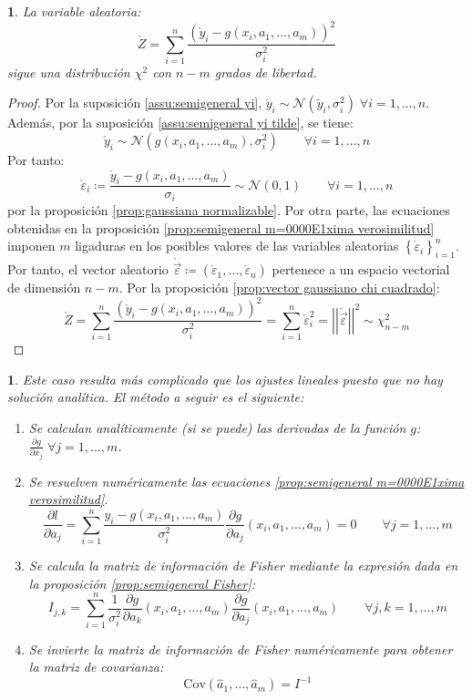 \documentclass[11pt,a4paper,spanish]{article}
\numberwithin{equation}{section}
\numberwithin{table}{section}
\numberwithin{figure}{section}
\theoremstyle{definition}
\theoremstyle{remark}
\theoremstyle{definition}
\theoremstyle{remark}
\theoremstyle{plain}
\newtheorem{prop}{\protect\propositionname}[section]
\theoremstyle{plain}
\theoremstyle{plain}
\theoremstyle{plain}
\theoremstyle{plain}
\theoremstyle{plain}
\newtheorem{lyxalgorithm}{\protect\algorithmname}[section]
\providecommand{\algorithmname}{Implementación en el ordenador}
\providecommand{\algorithmname}{Algoritmo}
\providecommand{\propositionname}{Proposición}
\begin{document}
	\begin{prop}\label{prop:semigeneral chi2}
		La variable aleatoria:
		\[
		\mathring{Z}=\sum_{i=1}^{n}\frac{\left(\mathring{y}_{i}-g\left(x_{i},a_{1},\dots,a_{m}\right)\right)^{2}}{\sigma_{i}^{2}}
		\]
		sigue una distribución $\chi^{2}$ con $n-m$ grados de libertad.
	\end{prop}
	\begin{proof}
		Por la suposición \vref{assu:semigeneral yi}, $\mathring{y}_{i}\sim\mathcal{N}\left(\tilde{y}_{i},\sigma_{i}^{2}\right)\;\forall i=1,\dots,n$.
		Además, por la suposición \vref{assu:semigeneral yi tilde}, se tiene:
		\[
		\mathring{y}_{i}\sim\mathcal{N}\left(g\left(x_{i},a_{1},\dots,a_{m}\right),\sigma_{i}^{2}\right)\qquad\forall i=1,\dots,n
		\]
		Por tanto:
		\[
		\mathring{\varepsilon}_{i}\coloneqq\frac{\mathring{y}_{i}-g\left(x_{i},a_{1},\dots,a_{m}\right)}{\sigma_{i}}\sim\mathcal{N}\left(0,1\right)\qquad\forall i=1,\dots,n
		\]
		por la proposición \vref{prop:gaussiana normalizable}. Por otra parte,
		las ecuaciones obtenidas en la proposición \vref{prop:semigeneral m=0000E1xima verosimilitud}
		imponen $m$ ligaduras en los posibles valores de las variables aleatorias
		$\left\{ \mathring{\varepsilon}_{i}\right\} _{i=1}^{n}$. Por tanto,
		el vector aleatorio $\mathring{\vec{\varepsilon}}\coloneqq\left(\mathring{\varepsilon}_{1},\dots,\mathring{\varepsilon}_{n}\right)$
		pertenece a un espacio vectorial de dimensión $n-m$. Por la proposición
		\vref{prop:vector gaussiano chi cuadrado}:
		\[
		\mathring{Z}=\sum_{i=1}^{n}\frac{\left(\mathring{y}_{i}-g\left(x_{i},a_{1},\dots,a_{m}\right)\right)^{2}}{\sigma_{i}^{2}}=\sum_{i=1}^{n}\mathring{\varepsilon}_{i}^{2}=\left|\left|\mathring{\vec{\varepsilon}}\right|\right|^{2}\sim\chi_{n-m}^{2}
		\]
	\end{proof}
	\begin{lyxalgorithm}
		Este caso resulta más complicado que los ajustes lineales puesto que
		no hay solución analítica. El método a seguir es el siguiente:
		\begin{enumerate}
			\item Se calculan analíticamente (si se puede) las derivadas de la función
			$g$: $\frac{\partial g}{\partial x_{j}}\;\forall j=1,\dots,m$.
			\item Se resuelven numéricamente las ecuaciones \vref{prop:semigeneral m=0000E1xima verosimilitud}.
			\[
			\frac{\partial l}{\partial a_{j}}=\sum_{i=1}^{n}\frac{y_{i}-g\left(x_{i},a_{1},\dots,a_{m}\right)}{\sigma_{i}^{2}}\frac{\partial g}{\partial a_{j}}\left(x_{i},a_{1},\dots,a_{m}\right)=0\qquad\forall j=1,\dots,m
			\]
			\item Se calcula la matriz de información de Fisher mediante la expresión
			dada en la proposición \vref{prop:semigeneral Fisher}:
			\[
			I_{j,k}=\sum_{i=1}^{n}\frac{1}{\sigma_{i}^{2}}\frac{\partial g}{\partial a_{k}}\left(x_{i},a_{1},\dots,a_{m}\right)\frac{\partial g}{\partial a_{j}}\left(x_{i},a_{1},\dots,a_{m}\right)\qquad\forall j,k=1,\dots,m
			\]
			\item Se invierte la matriz de información de Fisher numéricamente para
			obtener la matriz de covarianza:
			\[
			\mathrm{Cov}\left(\hat{a}_{1},\dots,\hat{a}_{m}\right)=I^{-1}
			\]
		\end{enumerate}
	\end{lyxalgorithm}
	
\end{document}
